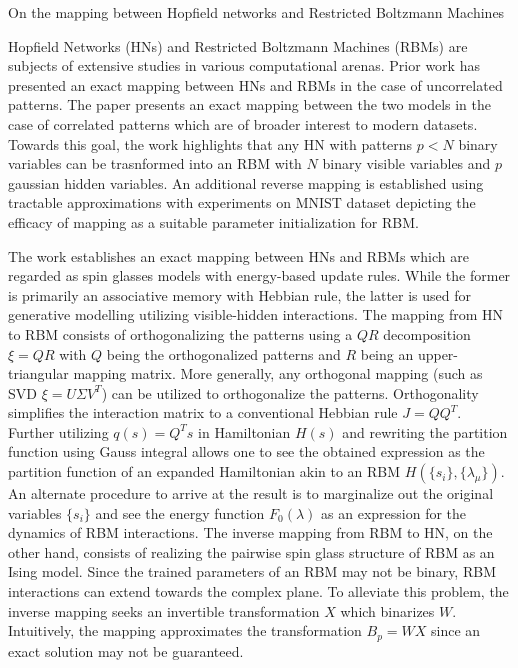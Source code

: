 \documentclass[11pt,letterpaper]{article}
\begin{document}
\begin{center}
  \large{On the mapping between Hopfield networks and Restricted Boltzmann Machines}
\end{center}

Hopfield Networks (HNs) and Restricted Boltzmann Machines (RBMs) are subjects of extensive studies in various computational arenas. Prior work has presented an exact mapping between HNs and RBMs in the case of uncorrelated patterns. The paper presents an exact mapping between the two models in the case of correlated patterns which are of broader interest to modern datasets. Towards this goal, the work highlights that any HN with patterns $p < N$ binary variables can be trasnformed into an RBM with $N$ binary visible variables and $p$ gaussian hidden variables. An additional reverse mapping is established using tractable approximations with experiments on MNIST dataset depicting the efficacy of mapping as a suitable parameter initialization for RBM.

The work establishes an exact mapping between HNs and RBMs which are regarded as spin glasses models with energy-based update rules. While the former is primarily an associative memory with Hebbian rule, the latter is used for generative modelling utilizing visible-hidden interactions. The mapping from HN to RBM consists of orthogonalizing the patterns using a $QR$ decomposition $\xi = QR$ with $Q$ being the orthogonalized patterns and $R$ being an upper-triangular mapping matrix. More generally, any orthogonal mapping (such as SVD $\xi = U\Sigma V^{T}$) can be utilized to orthogonalize the patterns. Orthogonality simplifies the interaction matrix to a conventional Hebbian rule $J = QQ^{T}$. Further utilizing $q(s) = Q^{T}s$ in Hamiltonian $H(s)$ and rewriting the partition function using Gauss integral allows one to see the obtained expression as the partition function of an expanded Hamiltonian akin to an RBM $H(\{s_{i}\},\{\lambda_{\mu}\})$. An alternate procedure to arrive at the result is to marginalize out the original variables $\{s_{i}\}$ and see the energy function $F_{0}(\lambda)$ as an expression for the dynamics of RBM interactions. The inverse mapping from RBM to HN, on the other hand, consists of realizing the pairwise spin glass structure of RBM as an Ising model. Since the trained parameters of an RBM may not be binary, RBM interactions can extend towards the complex plane. To alleviate this problem, the inverse mapping seeks an invertible transformation $X$ which binarizes $W$. Intuitively, the mapping approximates the transformation $B_{p} = WX$ since an exact solution may not be guaranteed. 
\end{document}
